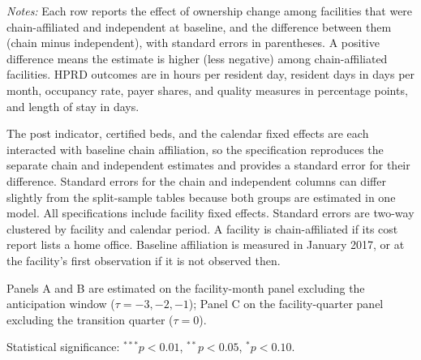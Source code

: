 \begin{table}[!ht]
\begin{threeparttable}
\begin{tablenotes}[flushleft]
\footnotesize
\item \textit{Notes:} Each row reports the effect of ownership change among facilities that were chain-affiliated and independent at baseline, and the difference between them (chain minus independent), with standard errors in parentheses. A positive difference means the estimate is higher (less negative) among chain-affiliated facilities. HPRD outcomes are in hours per resident day, resident days in days per month, occupancy rate, payer shares, and quality measures in percentage points, and length of stay in days.
\item The post indicator, certified beds, and the calendar fixed effects are each interacted with baseline chain affiliation, so the specification reproduces the separate chain and independent estimates and provides a standard error for their difference. Standard errors for the chain and independent columns can differ slightly from the split-sample tables because both groups are estimated in one model. All specifications include facility fixed effects. Standard errors are two-way clustered by facility and calendar period. A facility is chain-affiliated if its cost report lists a home office. Baseline affiliation is measured in January 2017, or at the facility's first observation if it is not observed then.
\item Panels A and B are estimated on the facility-month panel excluding the anticipation window ($\tau = -3, -2, -1$); Panel C on the facility-quarter panel excluding the transition quarter ($\tau = 0$). 
\item Statistical significance: $^{***}p<0.01$, $^{**}p<0.05$, $^{*}p<0.10$.
\end{tablenotes}

\end{threeparttable}
\end{table}

